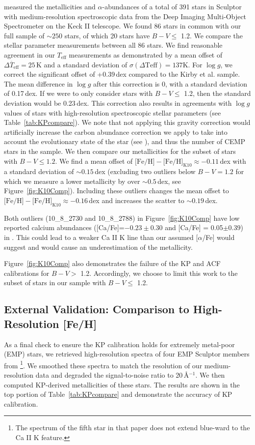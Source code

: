 \documentclass{emulateapj-rtx4}
\begin{document}
\citet{kgb+09,kgs+10,kcg+13} measured the metallicities and $\alpha$-abundances of a total of 391 
stars in Sculptor with medium-resolution spectroscopic data from the Deep Imaging Multi-Object Spectrometer 
on the Keck II telescope. We found 86 stars in common with our full sample 
of $\sim250$ stars, of which 20 stars have $B-V \le$ 1.2. 
We compare the stellar parameter measurements between 
all 86 stars.
We find reasonable agreement in our $T_{\text{eff}}$ measurements as demonstrated by a mean offset of $\overline{\Delta T_{\text{eff}}} = 25$\,K and a standard deviation of $\sigma(\Delta\text{Teff}) =137\text{K}$.
%
For $\log g$, we correct the significant offset of +0.39\,dex compared to the Kirby et al. sample.
The mean difference in $\log g$ after this correction is 0, with a standard deviation of 0.17\,dex. If we were to only consider stars with $B-V \le$ 1.2, then the standard deviation would be 0.23\,dex.
This correction also results in agreements with $\log g$ values of stars with high-resolution spectroscopic stellar parameters (see Table~\ref{tab:KPcompare}). We note that not applying this gravity correction would artificially increase the carbon abundance correction we apply to take into account the evolutionary state of the star (see \citealt{pfb+14}), and thus the number of CEMP stars in the sample.
%
We then compare our metallicities for the subset of stars with $B-V \le 1.2$. 
We find a mean offset of $\text{[Fe/H]} - \text{[Fe/H]}_{\text{K10}}\approx-0.11$\,dex 
with a standard deviation of $\sim0.15$\,dex (excluding two outliers below $B-V = 1.2$ for which we measure a lower metallicity by over $\sim0.5$\,dex, see Figure~\ref{fig:K10Comp}). Including these outliers changes the mean offset to $\text{[Fe/H]} - \text{[Fe/H]}_{\text{K10}}\approx-0.16$\,dex and increases the scatter to $\sim0.19$\,dex.

Both outliers (10\_8\_2730 and 10\_8\_2788) in Figure~\ref{fig:K10Comp} have low reported calcium abundances ([Ca/Fe]=$-0.23\pm0.30$ and [Ca/Fe] = 0.05$\pm0.39$) in \citet{kgs+10}. This could lead to a weaker Ca II K line than our assumed [$\alpha$/Fe] would suggest
and would cause an underestimation of the metallicity.

Figure~\ref{fig:K10Comp} also demonstrates the failure of the KP and ACF calibrations for $B-V >$ 1.2. Accordingly,
we choose to limit this work to the subset of stars in our sample with $B-V \le$ 1.2.

\subsection{External Validation: Comparison to High-Resolution [Fe/H]}
\label{sec:hiresfeh}
As a final check to ensure the KP calibration holds for extremely metal-poor (EMP) stars, 
we retrieved high-resolution spectra of four EMP Sculptor members from \citet{sjf+15}\footnote[2]{The spectrum of the 
fifth star in that paper does not extend blue-ward to the Ca II K feature.}. 
We smoothed these spectra to match the resolution of our medium-resolution data
and degraded the signal-to-noise ratio to 20\,\AA$^{-1}$.
We then computed KP-derived metallicities of these stars. 
The results are shown in the top
portion of Table~\ref{tab:KPcompare} and demonstrate the accuracy of KP calibration.
\end{document}

